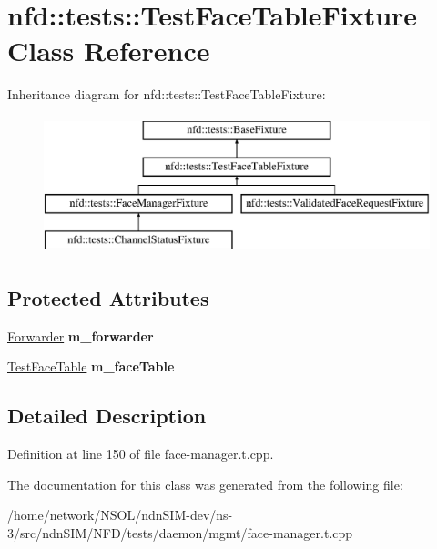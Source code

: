 \hypertarget{classnfd_1_1tests_1_1TestFaceTableFixture}{}\section{nfd\+:\+:tests\+:\+:Test\+Face\+Table\+Fixture Class Reference}
\label{classnfd_1_1tests_1_1TestFaceTableFixture}
Inheritance diagram for nfd\+:\+:tests\+:\+:Test\+Face\+Table\+Fixture\+:\begin{figure}[H]
\begin{center}
\leavevmode
\includegraphics[height=4.000000cm]{classnfd_1_1tests_1_1TestFaceTableFixture}
\end{center}
\end{figure}
\subsection*{Protected Attributes}
\begin{DoxyCompactItemize}
\item 
\hyperlink{classnfd_1_1Forwarder}{Forwarder} {\bfseries m\+\_\+forwarder}\hypertarget{classnfd_1_1tests_1_1TestFaceTableFixture_a49f0a5f60fcc585876a9273c74bb29c3}{}\label{classnfd_1_1tests_1_1TestFaceTableFixture_a49f0a5f60fcc585876a9273c74bb29c3}

\item 
\hyperlink{classnfd_1_1tests_1_1TestFaceTable}{Test\+Face\+Table} {\bfseries m\+\_\+face\+Table}\hypertarget{classnfd_1_1tests_1_1TestFaceTableFixture_a808aa0e432df1c8ec5dd4ad29e5e869d}{}\label{classnfd_1_1tests_1_1TestFaceTableFixture_a808aa0e432df1c8ec5dd4ad29e5e869d}

\end{DoxyCompactItemize}


\subsection{Detailed Description}


Definition at line 150 of file face-\/manager.\+t.\+cpp.



The documentation for this class was generated from the following file\+:\begin{DoxyCompactItemize}
\item 
/home/network/\+N\+S\+O\+L/ndn\+S\+I\+M-\/dev/ns-\/3/src/ndn\+S\+I\+M/\+N\+F\+D/tests/daemon/mgmt/face-\/manager.\+t.\+cpp\end{DoxyCompactItemize}
